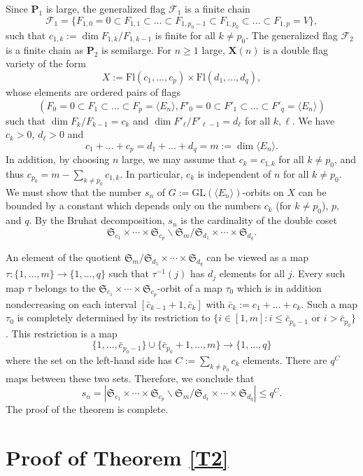\documentclass[12pt]{amsart}
\newcommand{\GL}{\mathrm{GL}}
\renewcommand{\P}{\mathbf{P}}
\newcommand{\X}{\mathbf{X}}
\newcommand{\Ff}{\mathcal{F}}
\renewcommand{\span}[1]{\langle #1\rangle}
\newcommand{\Fl}{\mathrm{Fl}}
\numberwithin{equation}{section}
\theoremstyle{definition}
\begin{document}
Since $\P_1$ is large, the generalized flag $\Ff_1$ is a finite chain
\[
\Ff_1=\{F_{1,0}=0\subset F_{1,1}\subset\ldots\subset F_{1,p_0-1}\subset F_{1,p_0}\subset\ldots\subset F_{1,p}=V\},
\]
such that $c_{1,k}:=\dim F_{1,k}/F_{1,k-1}$ is finite for all $k\not=p_0$.
The generalized flag $\Ff_2$ is a finite chain as $\P_2$ is semilarge. For $n\geq 1$ large, $\X(n)$ is a double flag variety of the form
\[
X:=\Fl(c_1,\ldots,c_p)\times \Fl(d_1,\ldots,d_q),
\]
whose elements are ordered pairs of flags
\[(F_0=0\subset F_1\subset\ldots\subset F_p=\span{E_n},F'_0=0\subset F'_1\subset \ldots\subset F'_q=\span{E_n})\]
such that $\dim F_k/F_{k-1}=c_k$ and $\dim F'_\ell/F'_{\ell-1}=d_\ell$ for all $k,\ell$.
We have $c_k>0$, $d_\ell>0$ and
\[c_1+\ldots+c_p=d_1+\ldots+d_q=m:=\dim\span{E_n}.\]
In addition, by choosing $n$ large, we may assume that  $c_k=c_{1,k}$ for all $k\not=p_0$, and thus $c_{p_0}=m-\sum_{k\not=p_0}c_{1,k}$. In particular, $c_k$ is independent of $n$ for all $k\not=p_0$.
We must show that the number $s_n$ of $G:=\GL(\span{E_n})$-orbits
on $X$ can be bounded by a constant which depends only on the numbers $c_k$ (for $k\not=p_0$), $p$, and $q$.
By the Bruhat decomposition, $s_n$ is the cardinality of the double coset
\[
\mathfrak{S}_{c_1}\times\cdots\times\mathfrak{S}_{c_p}\backslash\mathfrak{S}_m/\mathfrak{S}_{d_1}\times\cdots\times\mathfrak{S}_{d_q}.
\]

An element of the quotient $\mathfrak{S}_m/\mathfrak{S}_{d_1}\times\cdots\times\mathfrak{S}_{d_q}$ can be viewed as a map $\tau:\{1,\ldots,m\}\to\{1,\ldots,q\}$ such that $\tau^{-1}(j)$ has $d_j$ elements for all $j$. Every such map $\tau$ belongs to the 
$\mathfrak{S}_{c_1}\times\cdots\times\mathfrak{S}_{c_p}$-orbit of a map $\tau_0$ which is in addition nondecreasing on each interval $[\bar{c}_{k-1}+1,\bar{c}_k]$ with $\bar{c}_k:=c_1+\ldots+c_k$.
Such a map $\tau_0$ is completely determined by its restriction to $\{i\in[1,m]:i\leq \bar{c}_{p_0-1}\mbox{ or }i>\bar{c}_{p_0}\}$.
This restriction is a map
\[\{1,\ldots,\bar{c}_{p_0-1}\}\cup\{\bar{c}_{p_0}+1,\ldots,m\}\to \{1,\ldots,q\}\]
where the set on the left-hand side has $C:=\sum_{k\not=p_0}c_k$ elements. There are $q^C$ maps between these two sets. Therefore, we conclude that
\[s_n=|\mathfrak{S}_{c_1}\times\cdots\times\mathfrak{S}_{c_p}\backslash\mathfrak{S}_m/\mathfrak{S}_{d_1}\times\cdots\times\mathfrak{S}_{d_q}|\leq q^C.\]
The proof of the theorem is complete.


\section{Proof of Theorem \ref{T2}}
\end{document}
